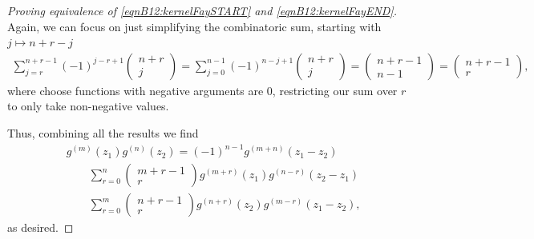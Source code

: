 \begin{proof}[Proving equivalence of \ref{eqnB12:kernelFaySTART} and \ref{eqnB12:kernelFayEND}]
Again, we can focus on just simplifying the combinatoric sum, starting with $j \mapsto n+r-j$
\begin{align}
    \sum_{j=r}^{n+r-1} (-1)^{j-r+1} \begin{pmatrix}n+r \\ j\end{pmatrix} = \sum_{j=0}^{n-1} (-1)^{n-j+1} \begin{pmatrix}n+r \\ j\end{pmatrix} = \begin{pmatrix} n+r-1 \\ n-1 \end{pmatrix} = \begin{pmatrix} n+r-1 \\ r \end{pmatrix},
\end{align}
where choose functions with negative arguments are 0, restricting our sum over $r$ to only take non-negative values.

Thus, combining all the results we find
\begin{align}
    & g^{(m)}(z_1)g^{(n)}(z_2) = (-1)^{n-1} g^{(m+n)}(z_1-z_2) \\
    & \quad \quad \sum_{r=0}^n \begin{pmatrix} m+r-1 \\ r \end{pmatrix} g^{(m+r)}(z_1) g^{(n-r)}(z_2-z_1) \\
    & \quad \quad \sum_{r=0}^m \begin{pmatrix} n+r-1 \\ r \end{pmatrix} g^{(n+r)}(z_2) g^{(m-r)}(z_1-z_2),
\end{align}
as desired.
\end{proof}